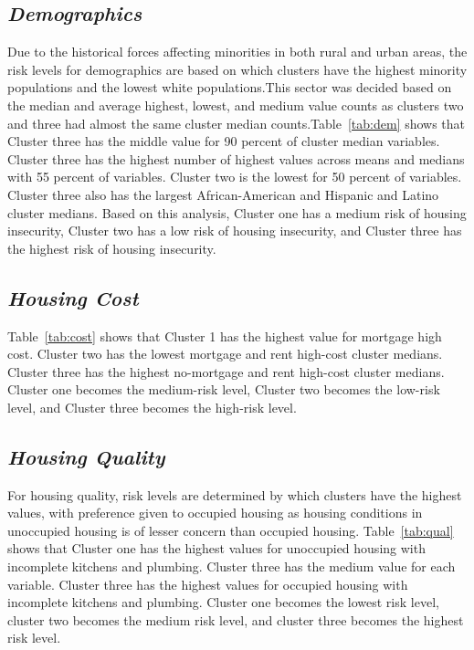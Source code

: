 \subsection{\textit{Demographics}}
Due to the historical forces affecting minorities in both rural and urban areas, the risk levels for demographics are based on which clusters have the highest minority populations and the lowest white populations.This sector was decided based on the median and average highest, lowest, and medium value counts as clusters two and three had almost the same cluster median counts.Table~\ref{tab:dem} shows that Cluster three has the middle value for 90 percent of cluster median variables. Cluster three has the highest number of highest values across means and medians with 55 percent of variables. Cluster two is the lowest for 50 percent of variables. Cluster three also has the largest African-American and Hispanic and Latino cluster medians. Based on this analysis, Cluster one has a medium risk of housing insecurity, Cluster two has a low risk of housing insecurity, and Cluster three has the highest risk of housing insecurity. 




\subsection{\textit{Housing Cost}}

Table~\ref{tab:cost} shows that Cluster 1 has the highest value for mortgage high cost. Cluster two has the lowest mortgage and rent high-cost cluster medians. Cluster three has the highest no-mortgage and rent high-cost cluster medians.  Cluster one becomes the medium-risk level, Cluster two becomes the low-risk level, and Cluster three becomes the high-risk level. 



\subsection{\textit{Housing Quality}}
For housing quality, risk levels are determined by which clusters have the highest values, with preference given to occupied housing as housing conditions in unoccupied housing is of lesser concern than occupied housing. Table~\ref{tab:qual} shows that Cluster one has the highest values for unoccupied housing with incomplete kitchens and plumbing. Cluster three has the medium value for each variable. Cluster three has the highest values for occupied housing with incomplete kitchens and plumbing. Cluster one becomes the lowest risk level, cluster two becomes the medium risk level, and cluster three becomes the highest risk level. 

